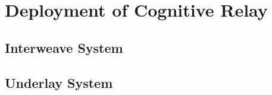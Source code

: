 \chapter{Deployment of Cognitive Relay}
\label{chap:Deploy}

\section{Interweave System}

\section{Underlay System}
%
%
